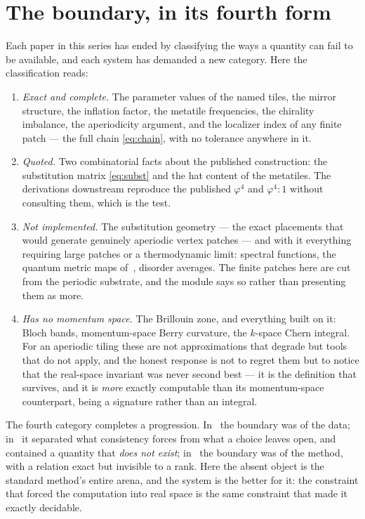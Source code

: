 \documentclass[11pt,a4paper]{article}
\theoremstyle{definition}
\begin{document}

\section{The boundary, in its fourth form}
\label{sec:boundary}

Each paper in this series has ended by classifying the ways a quantity can
fail to be available, and each system has demanded a new category. Here the
classification reads:

\begin{enumerate}[leftmargin=2em]
\item \emph{Exact and complete.} The parameter values of the named tiles,
the mirror structure, the inflation factor, the metatile frequencies, the
chirality imbalance, the aperiodicity argument, and the localizer index of
any finite patch --- the full chain \cref{eq:chain}, with no tolerance
anywhere in it.

\item \emph{Quoted.} Two combinatorial facts about the published
construction: the substitution matrix \cref{eq:subst} and the hat content
of the metatiles. The derivations downstream reproduce the published
$\varphi^4$ and $\varphi^4 : 1$ without consulting them, which is the test.

\item \emph{Not implemented.} The substitution geometry --- the exact
placements that would generate genuinely aperiodic vertex patches --- and
with it everything requiring large patches or a thermodynamic limit:
spectral functions, the quantum metric maps of~\cite{RocheCarrasco2025},
disorder averages. The finite patches here are cut from the periodic
substrate, and the module says so rather than presenting them as more.

\item \emph{Has no momentum space.} The Brillouin zone, and everything
built on it: Bloch bands, momentum-space Berry curvature, the
$k$-space Chern integral. For an aperiodic tiling these are not
approximations that degrade but tools that do not apply, and the honest
response is not to regret them but to notice that the real-space invariant
was never second best --- it is the definition that survives, and it is
\emph{more} exactly computable than its momentum-space counterpart, being a
signature rather than an integral.
\end{enumerate}

\noindent
The fourth category completes a progression. In~\cite{SuppMath} the
boundary was of the data; in~\cite{SuppStrings} it separated what
consistency forces from what a choice leaves open, and contained a quantity
that \emph{does not exist}; in~\cite{SuppTwistor} the boundary was of the
method, with a relation exact but invisible to a rank. Here the absent
object is the standard method's entire arena, and the system is the better
for it: the constraint that forced the computation into real space is the
same constraint that made it exactly decidable.
\end{document}
